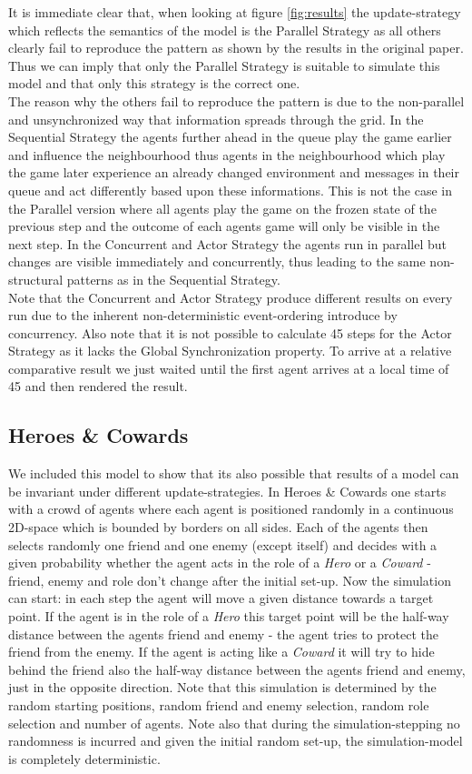 It is immediate clear that, when looking at figure \ref{fig:results} the update-strategy which reflects the semantics of the model is the Parallel Strategy as all others clearly fail to reproduce the pattern as shown by the results in the original paper. Thus we can imply that only the Parallel Strategy is suitable to simulate this model and that only this strategy is the correct one. \\
The reason why the others fail to reproduce the pattern is due to the non-parallel and unsynchronized way that information spreads through the grid. In the Sequential Strategy the agents further ahead in the queue play the game earlier and influence the neighbourhood thus agents in the neighbourhood which play the game later experience an already changed environment and  messages in their queue and act differently based upon these informations. This is not the case in the Parallel version where all agents play the game on the frozen state of the previous step and the outcome of each agents game will only be visible in the next step. In the Concurrent and Actor Strategy the agents run in parallel but changes are visible immediately and concurrently, thus leading to the same non-structural patterns as in the Sequential Strategy. \\
Note that the Concurrent and Actor Strategy produce different results on every run due to the inherent non-deterministic event-ordering introduce by concurrency. Also note that it is not possible to calculate 45 steps for the Actor Strategy as it lacks the Global Synchronization property. To arrive at a relative comparative result we just waited until the first agent arrives at a local time of 45 and then rendered the result. 

\subsection{Heroes \& Cowards}
We included this model to show that its also possible that results of a model can be invariant under different update-strategies. In Heroes \& Cowards one starts with a crowd of agents where each agent is positioned randomly in a continuous 2D-space which is bounded by borders on all sides. Each of the agents then selects randomly one friend and one enemy (except itself) and decides with a given probability whether the agent acts in the role of a \textit{Hero} or a \textit{Coward} - friend, enemy and role don't change after the initial set-up. Now the simulation can start: in each step the agent will move a given distance towards a target point. If the agent is in the role of a \textit{Hero} this target point will be the half-way distance between the agents friend and enemy - the agent tries to protect the friend from the enemy. If the agent is acting like a \textit{Coward} it will try to hide behind the friend also the half-way distance between the agents friend and enemy, just in the opposite direction. Note that this simulation is determined by the random starting positions, random friend and enemy selection, random role selection and number of agents. Note also that during the simulation-stepping no randomness is incurred and given the initial random set-up, the simulation-model is completely deterministic. \\

